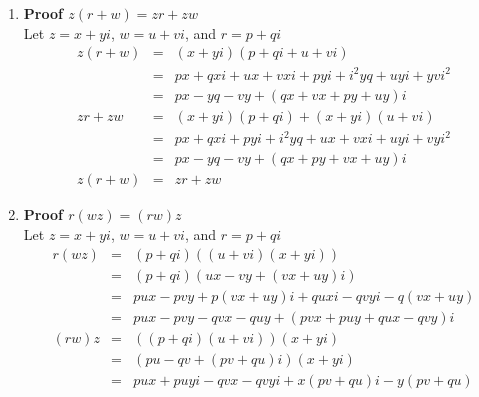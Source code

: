 \documentclass{article}%
\newenvironment{proof}[1][]{\begin{samepage}\textbf{Proof #1} }{\end{samepage}}
\begin{document}
\begin{enumerate}
\begin{enumerate}[label*=\arabic*.]
\begin{enumerate}[label=\alph*]
\begin{proof}[$zw=wz$]
\begin{eqnarray*}
                      &=&ux+xvi+yui+yvi^2 \\
                      &=&ux-vy+(vx+uy)i \\
                    wz&=&(u+vi)(x+yi) \\
                      &=&ux+uyi+vxi+vyi^2 \\
                      &=&ux-vy+(vx+uy)i \\
                    zw&=&wz
                \end{eqnarray*}
            \end{proof}
            \item
            \begin{proof}[$z(r+w)=zr+zw$]
                \\ Let $z=x+yi$, $w=u+vi$, and $r=p+qi$
                \begin{eqnarray*}
                    z(r+w)&=&(x+yi)(p+qi+u+vi) \\
                          &=&px+qxi+ux+vxi+pyi+i^2yq+uyi+yvi^2 \\
                          &=&px-yq-vy+(qx+vx+py+uy)i \\
                    zr+zw &=&(x+yi)(p+qi)+(x+yi)(u+vi) \\
                          &=&px+qxi+pyi+i^2yq+ux+vxi+uyi+vyi^2 \\
                          &=&px-yq-vy+(qx+py+vx+uy)i \\
                    z(r+w)&=&zr+zw
                \end{eqnarray*}
            \end{proof}
            \item
            \begin{proof}[$r(wz)=(rw)z$]
                \\ Let $z=x+yi$, $w=u+vi$, and $r=p+qi$
                \begin{eqnarray*}
                    r(wz)&=&(p+qi)((u+vi)(x+yi)) \\
                         &=&(p+qi)(ux-vy+(vx+uy)i) \\
                         &=&pux-pvy+p(vx+uy)i+quxi-qvyi-q(vx+uy) \\
                         &=&pux-pvy-qvx-quy+(pvx+puy+qux-qvy)i \\
                    (rw)z&=&((p+qi)(u+vi))(x+yi) \\
                         &=&(pu-qv+(pv+qu)i)(x+yi) \\
                         &=&pux+puyi-qvx-qvyi+x(pv+qu)i-y(pv+qu) \\

\end{eqnarray*}
\end{proof}
\end{enumerate}
\end{enumerate}
\end{enumerate}
\end{document}

